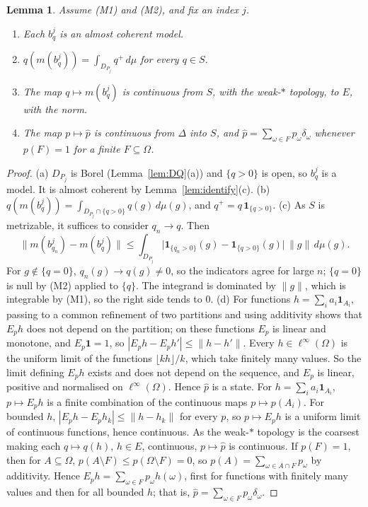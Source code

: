 \documentclass[11pt]{article}
\newtheorem{lemma}[theorem]{Lemma}
\theoremstyle{definition}
\newcommand{\one}{\mathbf 1}
\begin{document}
\begin{lemma}\label{lem:assigned}
Assume (M1) and (M2), and fix an index $j$.
\begin{enumerate}[label=(\alph*)]
\item Each $b^j_q$ is an almost coherent model.
\item $q(m(b^j_q))=\int_{D_{P_j}}q^+\,d\mu$ for every $q\in S$.
\item The map $q\mapsto m(b^j_q)$ is continuous from $S$, with the weak-$\ast$ topology, to $E$, with the norm.
\item The map $p\mapsto\hat p$ is continuous from $\Delta$ into $S$, and $\hat p=\sum_{\omega\in F}p_\omega\delta_\omega$ whenever $p(F)=1$ for a finite $F\subseteq\Omega$.
\end{enumerate}
\end{lemma}
\begin{proof}
(a) $D_{P_j}$ is Borel (Lemma~\ref{lem:DQ}(a)) and $\{q>0\}$ is open, so $b^j_q$ is a model. It is almost coherent by Lemma~\ref{lem:identify}(c).
(b) $q(m(b^j_q))=\int_{D_{P_j}\cap\{q>0\}}q(g)\,d\mu(g)$, and $q^+=q\,\one_{\{q>0\}}$.
(c) As $S$ is metrizable, it suffices to consider $q_n\to q$. Then
\[
\bigl\|m(b^j_{q_n})-m(b^j_q)\bigr\|\le\int_{D_{P_j}}\bigl|\one_{\{q_n>0\}}(g)-\one_{\{q>0\}}(g)\bigr|\,\|g\|\,d\mu(g).
\]
For $g\notin\{q=0\}$, $q_n(g)\to q(g)\ne0$, so the indicators agree for large $n$; $\{q=0\}$ is null by (M2) applied to $\{q\}$. The integrand is dominated by $\|g\|$, which is integrable by (M1), so the right side tends to $0$.
(d) For functions $h=\sum_ia_i\one_{A_i}$, passing to a common refinement of two partitions and using additivity shows that $E_ph$ does not depend on the partition; on these functions $E_p$ is linear and monotone, and $E_p\one=1$, so $|E_ph-E_ph'|\le\|h-h'\|$. Every $h\in\ell^\infty(\Omega)$ is the uniform limit of the functions $\lfloor kh\rfloor/k$, which take finitely many values. So the limit defining $E_ph$ exists and does not depend on the sequence, and $E_p$ is linear, positive and normalised on $\ell^\infty(\Omega)$. Hence $\hat p$ is a state. For $h=\sum_ia_i\one_{A_i}$, $p\mapsto E_ph$ is a finite combination of the continuous maps $p\mapsto p(A_i)$. For bounded $h$, $|E_ph-E_ph_k|\le\|h-h_k\|$ for every $p$, so $p\mapsto E_ph$ is a uniform limit of continuous functions, hence continuous. As the weak-$\ast$ topology is the coarsest making each $q\mapsto q(h)$, $h\in E$, continuous, $p\mapsto\hat p$ is continuous. If $p(F)=1$, then for $A\subseteq\Omega$, $p(A\setminus F)\le p(\Omega\setminus F)=0$, so $p(A)=\sum_{\omega\in A\cap F}p_\omega$ by additivity. Hence $E_ph=\sum_{\omega\in F}p_\omega h(\omega)$, first for functions with finitely many values and then for all bounded $h$; that is, $\hat p=\sum_{\omega\in F}p_\omega\delta_\omega$.
\end{proof}
\end{document}

